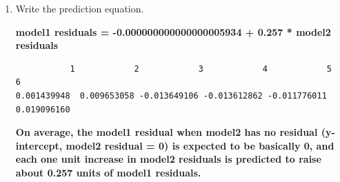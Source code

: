 \documentclass[12pt,letterpaper]{article}
\begin{document}
\begin{enumerate}
		\item Write the prediction equation.
		
\textbf{model1 residuals = -0.000000000000000005934 + 0.257 * model2 residuals}

\begin{verbatim}
           1            2            3            4            5            6 
0.001439948  0.009653058 -0.013649106 -0.013612862 -0.011776011  0.019096160 
\end{verbatim}
\textbf{On average, the model1 residual when model2 has no residual (y-intercept, model2 residual = 0) is expected to be basically 0, and each one unit increase in model2 residuals is predicted to raise about 0.257 units of model1 residuals.}

	\end{enumerate}
	
	\newpage	
\end{document}
